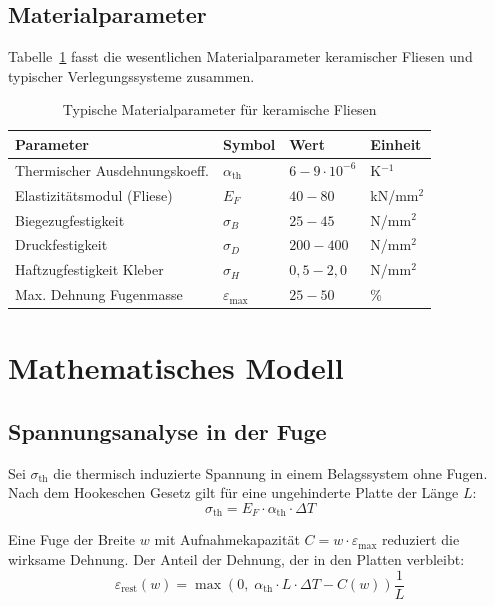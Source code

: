 ﻿\documentclass[a4paper,12pt]{article}
\theoremstyle{definition}
\begin{document}
\subsection{Materialparameter}

Tabelle~\ref{tab:parameter} fasst die wesentlichen Materialparameter
keramischer Fliesen und typischer Verlegungssysteme zusammen.

\begin{table}[h]
	\centering
	\caption{Typische Materialparameter für keramische Fliesen}
	\label{tab:parameter}
	\begin{tabular}{llll}
		\toprule
		Parameter & Symbol & Wert & Einheit \\
		\midrule
		Thermischer Ausdehnungskoeff. & $\alpha_{\text{th}}$ & $6{-}9 \cdot 10^{-6}$ & K$^{-1}$ \\
		Elastizitätsmodul (Fliese) & $E_F$ & $40{-}80$ & kN/mm$^2$ \\
		Biegezugfestigkeit & $\sigma_B$ & $25{-}45$ & N/mm$^2$ \\
		Druckfestigkeit & $\sigma_D$ & $200{-}400$ & N/mm$^2$ \\
		Haftzugfestigkeit Kleber & $\sigma_H$ & $0{,}5{-}2{,}0$ & N/mm$^2$ \\
		Max. Dehnung Fugenmasse & $\varepsilon_{\max}$ & $25{-}50$ & \% \\
		\bottomrule
	\end{tabular}
\end{table}

\section{Mathematisches Modell}

\subsection{Spannungsanalyse in der Fuge}

Sei $\sigma_{\text{th}}$ die thermisch induzierte Spannung in einem
Belagssystem ohne Fugen. Nach dem Hookeschen Gesetz gilt für eine
ungehinderte Platte der Länge $L$:
\[
\sigma_{\text{th}} = E_F \cdot \alpha_{\text{th}} \cdot \Delta T
\]

Eine Fuge der Breite $w$ mit Aufnahmekapazität $C = w \cdot \varepsilon_{\max}$
reduziert die wirksame Dehnung. Der Anteil der Dehnung, der in den
Platten verbleibt:
\[
\varepsilon_{\text{rest}}(w) = \max\!\left(0,\;\alpha_{\text{th}} \cdot L \cdot \Delta T - C(w)\right)
\frac{1}{L}
\]
\end{document}
